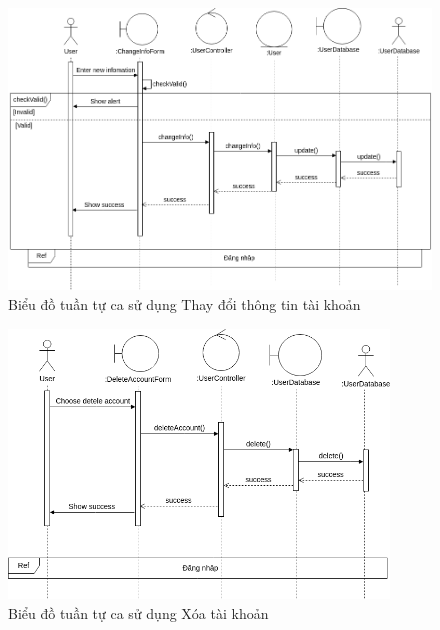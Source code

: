 \begin{figure}[H]
    \centering
    \includegraphics[width=\textwidth]{img2/Analysis-Thay đổi thông tin.drawio.png}
    \caption{Biểu đồ tuần tự ca sử dụng Thay đổi thông tin tài khoản}
\end{figure}

\begin{figure}[H]
    \centering
    \includegraphics[width=0.9\textwidth]{img2/Analysis-Xóa tài khoản.drawio.png}
    \caption{Biểu đồ tuần tự ca sử dụng Xóa tài khoản}
\end{figure}

